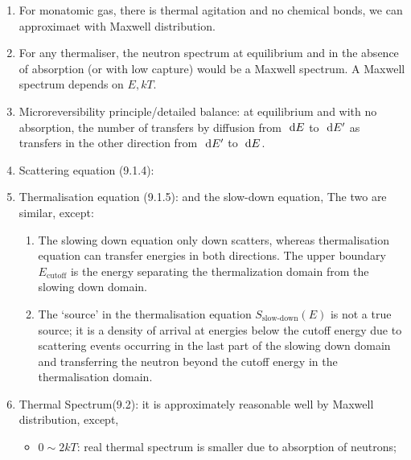 \documentclass{school-22.211-notes}
\begin{document}
\begin{enumerate}
\item For monatomic gas, there is thermal agitation and no chemical bonds, we can approximaet with Maxwell distribution. 
\item For any thermaliser, the neutron spectrum at equilibrium and in the absence of absorption (or with low capture) would be a Maxwell spectrum. A Maxwell spectrum depends on $E, kT$. 
\item Microreversibility principle/detailed balance: at equilibrium and with no absorption, the number of transfers by diffusion from $\mbox{ }\mathrm{d} E$ to $\mbox{ }\mathrm{d} E'$ as transfers in the other direction from $\mbox{ }\mathrm{d} E'$ to $\mbox{ }\mathrm{d} E$. 
\item Scattering equation (9.1.4): 
\item Thermalisation equation (9.1.5): 
  and the slow-down equation, 
  The two are similar, except:
  \begin{enumerate}
  \item The slowing down equation only down scatters, whereas thermalisation equation can transfer energies in both directions. The upper boundary $E_{\mathrm{cutoff}}$ is the energy separating the thermalization domain from the slowing down domain. 
  \item The `source' in the thermalisation equation $S_{\mbox{slow-down}}(E)$ is not a true source; it is a density of arrival at energies below the cutoff energy due to scattering events occurring in the last part of the slowing down domain and transferring the neutron beyond the cutoff energy in the thermalisation domain. 
  \end{enumerate}
\item Thermal Spectrum(9.2): it is approximately reasonable well by Maxwell distribution, except,
  \begin{itemize}
    \item $0\sim 2kT$: real thermal spectrum is smaller due to absorption of neutrons;

\end{itemize}
\end{enumerate}
\end{document}
